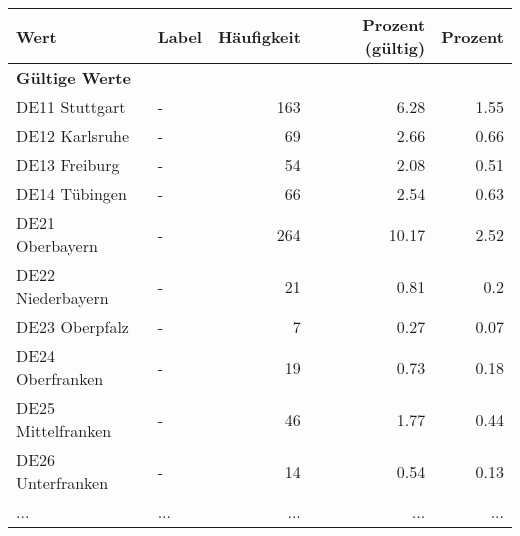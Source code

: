      \begin{longtable}{Xlrrr}
     \toprule
     \textbf{Wert} & \textbf{Label} & \textbf{Häufigkeit} & \textbf{Prozent (gültig)} & \textbf{Prozent} \\
     \endhead
     \midrule
     \multicolumn{5}{l}{\textbf{Gültige Werte}}\\
        \multicolumn{1}{X}{DE11 Stuttgart} & - & \num{163} & \num[round-mode=places,round-precision=2]{6.28} & \num[round-mode=places,round-precision=2]{1.55} \\
        \multicolumn{1}{X}{DE12 Karlsruhe} & - & \num{69} & \num[round-mode=places,round-precision=2]{2.66} & \num[round-mode=places,round-precision=2]{0.66} \\
        \multicolumn{1}{X}{DE13 Freiburg} & - & \num{54} & \num[round-mode=places,round-precision=2]{2.08} & \num[round-mode=places,round-precision=2]{0.51} \\
        \multicolumn{1}{X}{DE14 Tübingen} & - & \num{66} & \num[round-mode=places,round-precision=2]{2.54} & \num[round-mode=places,round-precision=2]{0.63} \\
        \multicolumn{1}{X}{DE21 Oberbayern} & - & \num{264} & \num[round-mode=places,round-precision=2]{10.17} & \num[round-mode=places,round-precision=2]{2.52} \\
        \multicolumn{1}{X}{DE22 Niederbayern} & - & \num{21} & \num[round-mode=places,round-precision=2]{0.81} & \num[round-mode=places,round-precision=2]{0.2} \\
        \multicolumn{1}{X}{DE23 Oberpfalz} & - & \num{7} & \num[round-mode=places,round-precision=2]{0.27} & \num[round-mode=places,round-precision=2]{0.07} \\
        \multicolumn{1}{X}{DE24 Oberfranken} & - & \num{19} & \num[round-mode=places,round-precision=2]{0.73} & \num[round-mode=places,round-precision=2]{0.18} \\
        \multicolumn{1}{X}{DE25 Mittelfranken} & - & \num{46} & \num[round-mode=places,round-precision=2]{1.77} & \num[round-mode=places,round-precision=2]{0.44} \\
        \multicolumn{1}{X}{DE26 Unterfranken} & - & \num{14} & \num[round-mode=places,round-precision=2]{0.54} & \num[round-mode=places,round-precision=2]{0.13} \\
       ... & ... & ... & ... & ... \\

\end{longtable}
